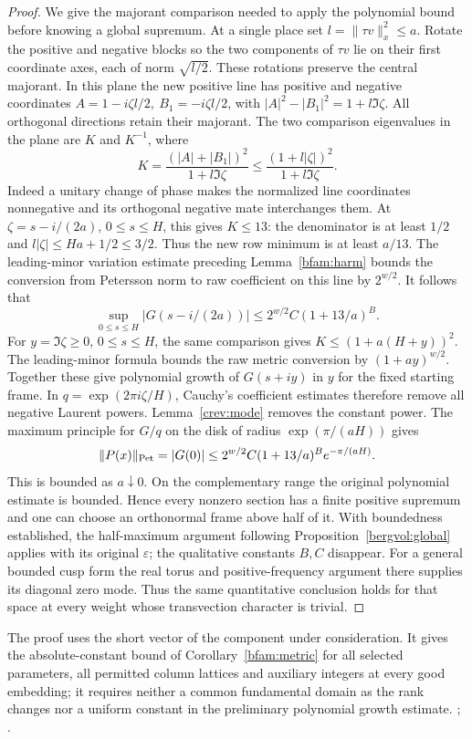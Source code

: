\begin{proof}
We give the majorant comparison needed to apply the polynomial bound
before knowing a global supremum. At a single place set
\(l=\|\tau v\|_x^2\le a\). Rotate the positive and negative blocks
so the two components of \(\tau v\) lie on their first coordinate
axes, each of norm \(\sqrt{l/2}\). These rotations preserve the
central majorant. In this plane the new positive line has positive
and negative coordinates \(A=1-i\zeta l/2,\ B_1=-i\zeta l/2\),
with \(|A|^2-|B_1|^2=1+l\Im\zeta\). All orthogonal directions
retain their majorant. The two comparison eigenvalues in the plane
are \(K\) and \(K^{-1}\), where
\[
 K=\frac{(|A|+|B_1|)^2}{1+l\Im\zeta}
    \le\frac{(1+l|\zeta|)^2}{1+l\Im\zeta}.
\]
Indeed a unitary change of phase makes the normalized line coordinates
nonnegative and its orthogonal negative mate interchanges them.
At \(\zeta=s-i/(2a)\), \(0\le s\le H\), this gives \(K\le 13\):
the denominator is at least \(1/2\) and
\(l|\zeta|\le Ha+1/2\le3/2\).
Thus the new row minimum is at least \(a/13\).
The leading-minor variation estimate preceding
Lemma~\ref{bfam:harm} bounds the conversion from Petersson norm
to raw coefficient on this line by \(2^{w/2}\).
It follows that
\[
      \sup_{0\le s\le H}|G(s-i/(2a))|
                    \le 2^{w/2}C(1+13/a)^B .
\]
For \(y=\Im\zeta\ge0\), \(0\le s\le H\), the same comparison
gives \(K\le(1+a(H+y))^2\). The leading-minor formula bounds
the raw metric conversion by \((1+ay)^{w/2}\).
Together these give polynomial growth of \(G(s+iy)\) in \(y\)
for the fixed starting frame. In \(q=\exp(2\pi i\zeta/H)\),
Cauchy's coefficient estimates therefore remove all negative
Laurent powers. Lemma~\ref{crev:mode} removes the constant power.
The maximum principle for \(G/q\) on the disk of radius
\(\exp(\pi/(aH))\) gives
\[
      \|P(x)\|_{\rm Pet}=|G(0)|
       \le 2^{w/2}C(1+13/a)^B e^{-\pi/(aH)} .
\]
This is bounded as \(a\downarrow0\). On the complementary range
the original polynomial estimate is bounded. Hence every nonzero
section has a finite positive supremum and one can choose an
orthonormal frame above half of it. With boundedness established,
the half-maximum argument following Proposition~\ref{bergvol:global}
applies with its original \(\varepsilon\); the qualitative constants
\(B,C\) disappear. For a general bounded cusp form the real torus
and positive-frequency argument there supplies its diagonal zero
mode. Thus the same quantitative conclusion holds for that space
at every weight whose transvection character is trivial.
\end{proof}
The proof uses the short vector of the component under consideration.
It gives the absolute-constant bound of Corollary~\ref{bfam:metric}
for all selected parameters, all permitted column lattices and
auxiliary integers at every good embedding; it requires neither
a common fundamental domain as the rank changes nor a uniform
constant in the preliminary polynomial growth estimate.
;
.

